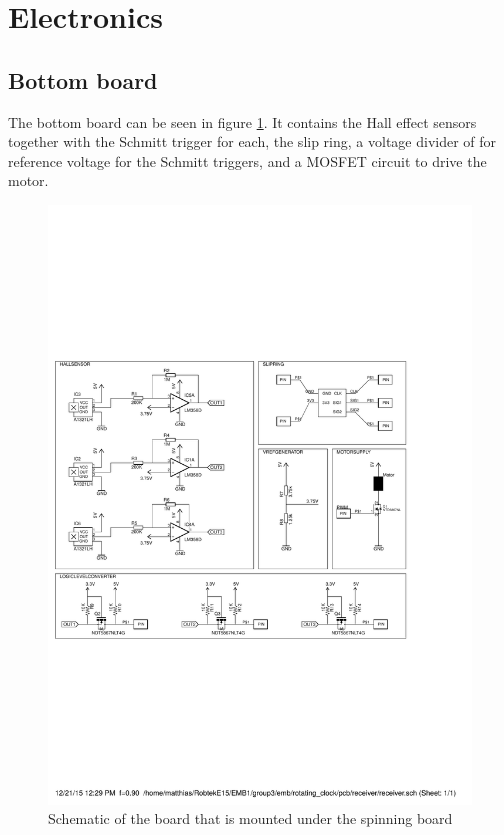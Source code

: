 \section{Electronics}

\subsection{Bottom board}
The bottom board can be seen in figure \ref{fig:botm_schematic}.
It contains the Hall effect sensors together with the Schmitt trigger for each, the slip ring, a voltage divider of for reference voltage for the Schmitt triggers, and a MOSFET circuit to drive the motor. 
\begin{figure}[h]
 \centering
 \includegraphics[scale=0.7,trim = 0 7cm 0 7cm,clip = true]{img/bottompcb_schematic}
 \caption{Schematic of the board that is mounted under the spinning board}
 \label{fig:botm_schematic}
\end{figure}


